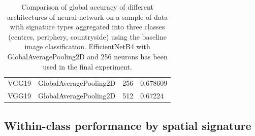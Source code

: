 \begin{table}[H]
\begin{tabular}{llll}
           VGG19 &   GlobalAveragePooling2D &                    256 &  0.678609 \\
           VGG19 &   GlobalAveragePooling2D &                    512 &   0.67224 \\
    \bottomrule
    \end{tabular}
\caption{\label{tab:app_nns}\footnotesize Comparison of global accuracy of different
architectures of neural network on a sample of data with signature types aggregated into
three classes (centres, periphery, countryside) using the baseline image classification.
EfficientNetB4 with GlobalAveragePooling2D and 256 neurons has been used in the final
experiment.}
\end{table}


\pagebreak

\subsection{Within-class performance by spatial signature}
\label{sec:appendixB}

